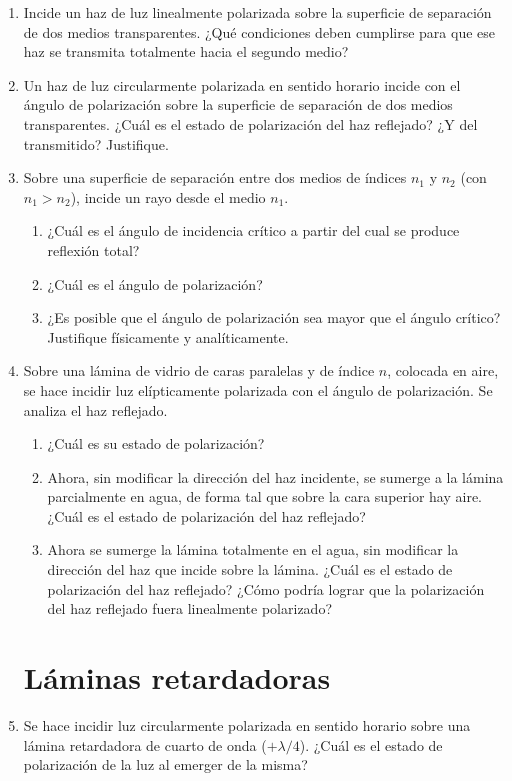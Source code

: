 \documentclass[11pt,spanish,a4paper]{article}
\begin{document}
\begin{enumerate}
\item Incide un haz de luz linealmente polarizada sobre la superficie de
separación de dos medios transparentes. ¿Qué condiciones deben cumplirse
para que ese haz se transmita totalmente hacia el segundo medio?


\item Un haz de luz circularmente polarizada en sentido horario incide con
el ángulo de polarización sobre la superficie de separación de dos
medios transparentes. ¿Cuál es el estado de polarización del haz reflejado?
¿Y del transmitido? Justifique.
\item Sobre una superficie de separación entre dos medios de índices $n_{1}$
y $n_{2}$ (con $n_{1}>n_{2}$), incide un rayo desde el medio $n_{1}$.
\begin{enumerate}
\item ¿Cuál es el ángulo de incidencia crítico a partir del cual se produce
reflexión total? 
\item ¿Cuál es el ángulo de polarización? 
\item ¿Es posible que el ángulo de polarización sea mayor que el ángulo
crítico? Justifique físicamente y analíticamente.
\end{enumerate}


\item Sobre una lámina de vidrio de caras paralelas y de índice $n$, colocada
en aire, se hace incidir luz elípticamente polarizada con el ángulo
de polarización. Se analiza el haz reflejado.
\begin{enumerate}
\item ¿Cuál es su estado de polarización?
\item Ahora, sin modificar la dirección del haz incidente, se sumerge a
la lámina parcialmente en agua, de forma tal que sobre la cara superior
hay aire. ¿Cuál es el estado de polarización del haz reflejado?
\item Ahora se sumerge la lámina totalmente en el agua, sin modificar la
dirección del haz que incide sobre la lámina. ¿Cuál es el estado de
polarización del haz reflejado? ¿Cómo podría lograr que la polarización
del haz reflejado fuera linealmente polarizado?
\end{enumerate}


\section*{Láminas retardadoras}
\item Se hace incidir luz circularmente polarizada en sentido horario sobre
una lámina retardadora de cuarto de onda ($+\lambda/4$). ¿Cuál es
el estado de polarización de la luz al emerger de la misma?



\end{enumerate}
\end{document}
